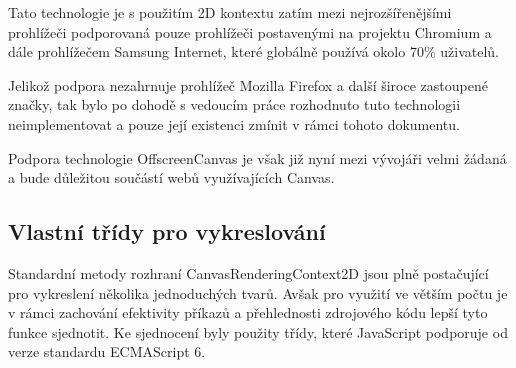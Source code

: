 Tato technologie je s použitím 2D kontextu zatím mezi nejrozšířenějšími prohlížeči podporovaná pouze prohlížeči postavenými na projektu Chromium a dále prohlížečem Samsung Internet, které globálně používá okolo 70\% uživatelů. \cite{web:CanIUse/OffscreenCanvas}

Jelikož podpora nezahrnuje prohlížeč Mozilla Firefox a další široce zastoupené značky, tak bylo po dohodě s vedoucím práce rozhodnuto tuto technologii neimplementovat a pouze její existenci zmínit v rámci tohoto dokumentu.

Podpora technologie OffscreenCanvas je však již nyní mezi vývojáři velmi žádaná a bude důležitou součástí webů využívajících Canvas.



\subsection{Vlastní třídy pro vykreslování}
Standardní metody rozhraní CanvasRenderingContext2D jsou plně postačující pro vykreslení několika jednoduchých tvarů.
Avšak pro využití ve větším počtu je v rámci zachování efektivity příkazů a přehlednosti zdrojového kódu lepší tyto funkce sjednotit.
Ke sjednocení byly použity třídy, které JavaScript podporuje od verze standardu ECMAScript 6.

